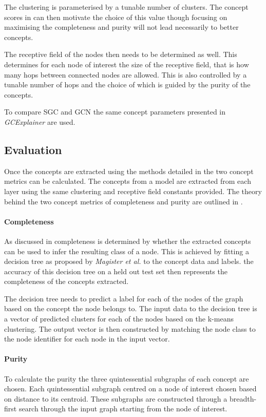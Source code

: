The clustering is parameterised by a tunable number of clusters.
The concept scores in  can then motivate the choice of this value though focusing on maximising the completeness and purity will not lead necessarily to better concepts.

The receptive field of the nodes then needs to be determined as well.
This determines for each node of interest the size of the receptive field, that is how many hops between connected nodes are allowed.
This is also controlled by a tunable number of hops and the choice of which is guided by the purity of the concepts.

To compare SGC and GCN the same concept parameters presented in \textit{GCExplainer}\cite{magister2021gcexplainer} are used.

\subsection{Evaluation}
\label{sec:concept-eval}

Once the concepts are extracted using the methods detailed in  the two concept metrics can be calculated.
The concepts from a model are extracted from each layer using the same clustering and receptive field constants provided.
The theory behind the two concept metrics of completeness and purity are outlined in .

\paragraph{Completeness}
As discussed in  completeness is determined by whether the extracted concepts can be used to infer the resulting class of a node.
This is achieved by fitting a decision tree\cite{kazhdan2020now} as proposed by \textit{Magister et al.}\cite{magister2021gcexplainer} to the concept data and labels.
the accuracy of this decision tree on a held out test set then represents the completeness of the concepts extracted.

The decision tree needs to predict a label for each of the nodes of the graph based on the concept the node belongs to.
The input data to the decision tree is a vector of predicted clusters for each of the nodes based on the k-means clustering.
The output vector is then constructed by matching the node class to the node identifier for each node in the input vector.

\paragraph{Purity}
To calculate the purity the three quintessential subgraphs of each concept are chosen.
Each quintessential subgraph centred on a node of interest chosen based on distance to its centroid.
These subgraphs are constructed through a breadth-first search through the input graph starting from the node of interest.

